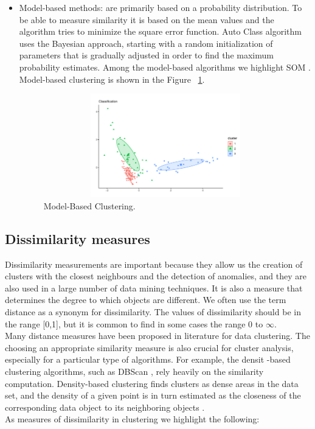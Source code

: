 \begin{itemize}
  \item Model-based methods: are primarily based on a probability distribution. To be able to measure similarity it is based on the mean values and the algorithm tries to minimize the square error function. Auto Class algorithm uses the Bayesian approach, starting with a random initialization of parameters that is gradually adjusted in order to find the maximum probability estimates. Among the model-based algorithms we highlight SOM \citep{b34}. Model-based clustering is shown in the Figure ~\ref{fig:model}.
    \begin{figure}[htbp]
  \centering
   \includegraphics[width=14cm, height=4.5cm]{img/model}
    \caption{Model-Based Clustering.}
    \label{fig:model}%
\end{figure}
\end{itemize}

\subsection {Dissimilarity measures}

Dissimilarity measurements are important because they allow us the creation of clusters with the closest neighbours and the detection of anomalies, and they are also used in a large number of data mining techniques. It is also a measure that determines the degree to which objects are different. We often use the term distance as a synonym for dissimilarity. The values of dissimilarity should be in the range [0,1], but it is common to find in some cases the range 0 to $\infty$.
\\
Many distance measures have been proposed in literature for data clustering. The choosing an appropriate similarity measure is also crucial for cluster analysis, especially for a particular type of algorithms. For example, the densit -based clustering algorithms, such as DBScan \citep{b28}, rely heavily on the similarity computation. Density-based clustering finds clusters as dense areas in the data set, and the density of a given point is in turn estimated as the closeness of the corresponding data object to its neighboring objects \citep{b50} \citep{b51}.
\\
As measures of dissimilarity in clustering we highlight the following:

